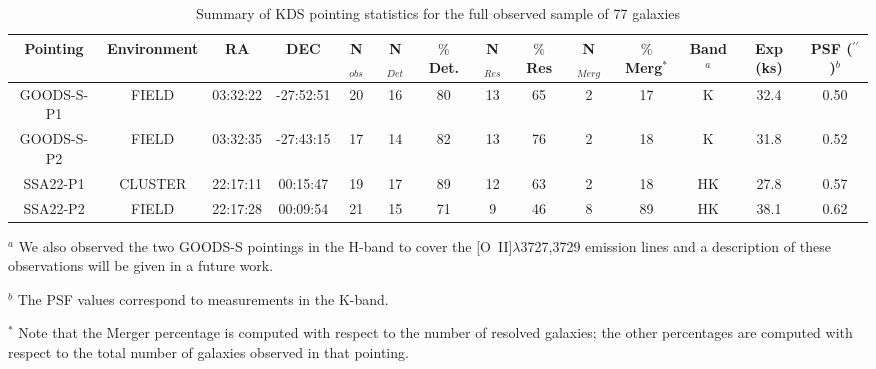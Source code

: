 \documentclass[fleqn,usenatbib]{mn2e}
\begin{document}
\begin{table*}
\centering
\begin{threeparttable}
\caption{Summary of KDS pointing statistics for the full observed sample of 77 galaxies}
\label{tab:pointings}
\begin{tabular}{c c c c c c c c c c c c c c}

 \hline
Pointing & Environment & RA & DEC & N$_{obs}$ & N$_{Det}$ & $\%$ Det. & N$_{Res}$ & $\%$ Res & N$_{Merg}$ & $\%$ Merg$^{*}$ & Band$^{a}$ & Exp (ks) & PSF ($^{\prime\prime}$)$^{b}$  \\
 \hline
 GOODS-S-P1 & FIELD & 03:32:22 & -27:52:51 & 20 & 16 & 80 & 13 & 65 & 2 & 17 & K & 32.4 & 0.50 \\
GOODS-S-P2 & FIELD & 03:32:35 & -27:43:15 & 17 & 14 & 82 & 13 & 76 & 2 & 18 & K & 31.8 & 0.52 \\
SSA22-P1 & CLUSTER & 22:17:11 & 00:15:47 & 19 & 17 & 89 & 12 & 63 & 2 & 18 & HK & 27.8 & 0.57 \\
SSA22-P2 & FIELD & 22:17:28 & 00:09:54 & 21 & 15 & 71 & 9 & 46 & 8 & 89 & HK & 38.1 & 0.62 \\
 \hline
\end{tabular}
\begin{tablenotes}
      \small
      \item $^{a}$ We also observed the two GOODS-S pointings in the H-band to cover the [O~{\sc II}]$\lambda$3727,3729 emission lines and a description of these observations will be given in a future work.
      \item $^{b}$ The PSF values correspond to measurements in the K-band.
      \item $^{*}$ Note that the Merger percentage is computed with respect to the number of resolved galaxies; the other percentages are computed with respect to the total number of galaxies observed in that pointing.
    \end{tablenotes}
  \end{threeparttable}
  \end{table*}
\end{document}
